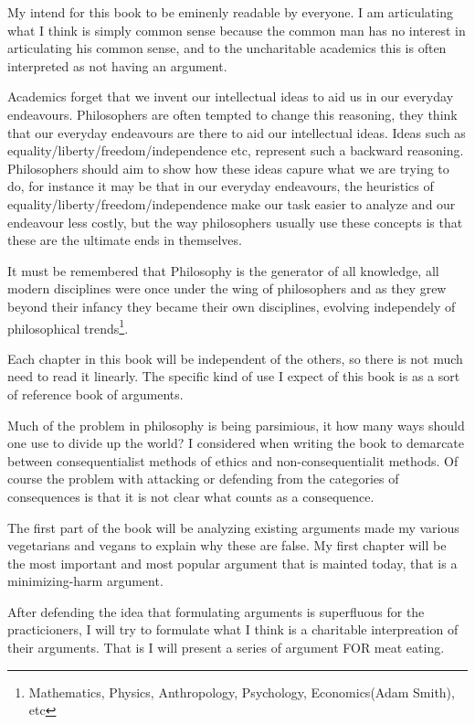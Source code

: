 \documentclass[12pt]{report}
\numberwithin{equation}{section}
\begin{document}
My intend for this book to be eminenly readable by everyone. I am articulating what I think is simply common sense because the common man has no interest in articulating his common sense, and to the uncharitable academics this is often interpreted as not having an argument. 

Academics forget that we invent our intellectual ideas to aid us in our everyday endeavours. Philosophers are often tempted to change this reasoning, they think that our everyday endeavours are there to aid our intellectual ideas. Ideas such as equality/liberty/freedom/independence etc, represent such a backward reasoning. Philosophers should aim to show how these ideas capure what we are trying to do, for instance it may be that in our everyday endeavours, the heuristics of equality/liberty/freedom/independence make our task easier to analyze and our endeavour less costly, but the way philosophers usually use these concepts is that these are the ultimate ends in themselves. 


It must be remembered that Philosophy is the generator of all knowledge, all modern disciplines were once under the wing of philosophers and as they grew beyond their infancy they became their own disciplines, evolving independely of philosophical trends\footnote{Mathematics, Physics, Anthropology, Psychology, Economics(Adam Smith), etc}. 


Each chapter in this book will be independent of the others, so there is not much need to read it linearly. The specific kind of use I expect of this book is as a sort of reference book of arguments. 

Much of the problem in philosophy is being parsimious, it how many ways should one use to divide up the world? I considered when writing the book to demarcate between consequentialist methods of ethics and non-consequentialit methods. Of course the problem with attacking or defending from the categories of consequences is that it is not clear what counts as a consequence. 

The first part of the book will be analyzing existing arguments made my various vegetarians and vegans to explain why these are false. My first chapter will be the most important and most popular argument that is mainted today, that is a minimizing-harm argument. 

After defending the idea that formulating arguments is superfluous for the practicioners, I will try to formulate what I think is a charitable interpreation of their arguments. That is I will present a series of argument FOR meat eating. 
\end{document}
